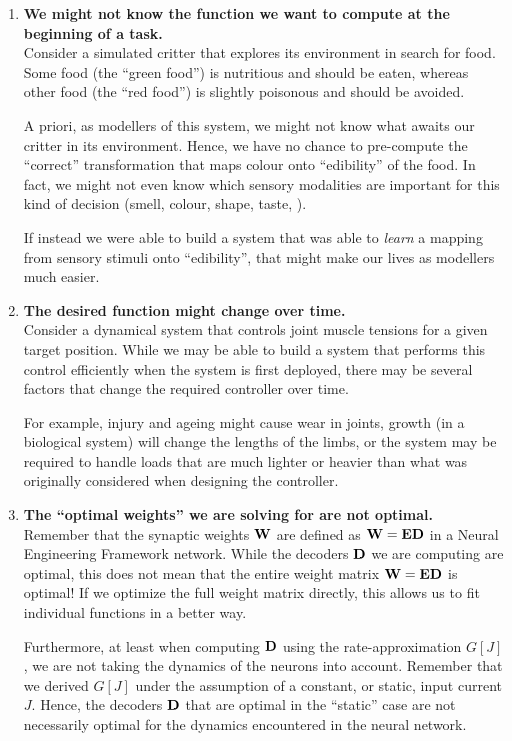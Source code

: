 \documentclass[10pt,letterpaper,oneside]{article}
\begin{document}
\begin{enumerate}[1.]
	\item \textbf{We might not know the function we want to compute at the beginning of a task.}\\
	Consider a simulated critter that explores its environment in search for food. Some food (the \enquote{green food}) is nutritious and should be eaten, whereas other food (the \enquote{red food}) is slightly poisonous and should be avoided.
	
	A priori, as modellers of this system, we might not know what awaits our critter in its environment. Hence, we have no chance to pre-compute the \enquote{correct} transformation that maps colour onto \enquote{edibility} of the food. In fact, we might not even know which sensory modalities are important for this kind of decision (smell, colour, shape, taste, \textellipsis).

	If instead we were able to build a system that was able to \emph{learn} a mapping from sensory stimuli onto \enquote{edibility}, that might make our lives as modellers much easier.

	\item \textbf{The desired function might change over time.}\\
	Consider a dynamical system that controls joint muscle tensions for a given target position. While we may be able to build a system that performs this control efficiently when the system is first deployed, there may be several factors that change the required controller over time.

	For example, injury and ageing might cause wear in joints, growth (in a biological system) will change the lengths of the limbs, or the system may be required to handle loads that are much lighter or heavier than what was originally considered when designing the controller.

	\item \textbf{The \enquote{optimal weights} we are solving for are not optimal.}\\
	Remember that the synaptic weights ${\mathbf{W}}$ are defined as ${\mathbf{W}} = {\mathbf{E}} {\mathbf{D}}$ in a Neural Engineering Framework network. While the decoders ${\mathbf{D}}$ we are computing are optimal, this does not mean that the entire weight matrix ${\mathbf{W}} = {\mathbf{E}} {\mathbf{D}}$ is optimal! If we optimize the full weight matrix directly, this allows us to fit individual functions in a better way.
	
	Furthermore, at least when computing ${\mathbf{D}}$ using the rate-approximation $G[J]$, we are not taking the dynamics of the neurons into account. Remember that we derived $G[J]$ under the assumption of a constant, or static, input current $J$. Hence, the decoders ${\mathbf{D}}$ that are optimal in the \enquote{static} case are not necessarily optimal for the dynamics encountered in the neural network.


\end{enumerate}
\end{document}
